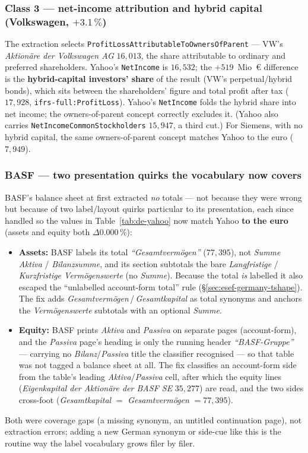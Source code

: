 \documentclass[11pt,a4paper]{report}
\begin{document}
\subsubsection*{Class 3 --- net-income attribution and hybrid capital (Volkswagen, $+3.1\,\%$)}
The extraction selects \texttt{ProfitLossAttributableToOwnersOfParent} --- VW's \emph{Aktion\"are der
Volkswagen AG} $16{,}013$, the share attributable to ordinary and preferred shareholders. Yahoo's
\texttt{NetIncome} is $16{,}532$; the $+519$~Mio~€ difference is the \textbf{hybrid-capital investors' share}
of the result (VW's perpetual/hybrid bonds), which sits between the shareholders' figure and total profit
after tax ($17{,}928$, \texttt{ifrs-full:ProfitLoss}). Yahoo's \texttt{NetIncome} folds the hybrid share into
net income; the owners-of-parent concept correctly excludes it. (Yahoo also carries
\texttt{NetIncomeCommonStockholders} $15{,}947$, a third cut.) For Siemens, with no hybrid capital, the same
owners-of-parent concept matches Yahoo to the euro ($7{,}949$).

\subsubsection*{BASF --- two presentation quirks the vocabulary now covers}
BASF's balance sheet at first extracted \emph{no} totals --- not because they were wrong but because of two
label/layout quirks particular to its presentation, each since handled so the values in
Table~\ref{tab:de-yahoo} now match Yahoo \textbf{to the euro} (assets and equity both $\Delta 0.000\,\%$):
\begin{itemize}
  \item \textbf{Assets:} BASF labels its total \emph{``Gesamtverm\"ogen''} ($77{,}395$), not \emph{Summe
    Aktiva} / \emph{Bilanzsumme}, and its section subtotals the bare \emph{Langfristige} / \emph{Kurzfristige
    Verm\"ogenswerte} (no \emph{Summe}). Because the total \emph{is} labelled it also escaped the
    ``unlabelled account-form total'' rule (\S\ref{sec:esef-germany-tshape}). The fix adds
    \emph{Gesamtverm\"ogen}\,/\,\emph{Gesamtkapital} as total synonyms and anchors the \emph{Verm\"ogenswerte}
    subtotals with an optional \emph{Summe}.
  \item \textbf{Equity:} BASF prints \emph{Aktiva} and \emph{Passiva} on separate pages (account-form), and
    the \emph{Passiva} page's heading is only the running header \emph{``BASF-Gruppe''} --- carrying no
    \emph{Bilanz}/\emph{Passiva} title the classifier recognised --- so that table was not tagged a balance
    sheet at all. The fix classifies an account-form side from the table's leading \emph{Aktiva}/\emph{Passiva}
    cell, after which the equity lines (\emph{Eigenkapital der Aktion\"are der BASF SE} $35{,}277$) are read,
    and the two sides cross-foot (\emph{Gesamtkapital} $=$ \emph{Gesamtverm\"ogen} $=77{,}395$).
\end{itemize}
Both were coverage gaps (a missing synonym, an untitled continuation page), not extraction errors; adding a
new German synonym or side-cue like this is the routine way the label vocabulary grows filer by filer.
\end{document}
